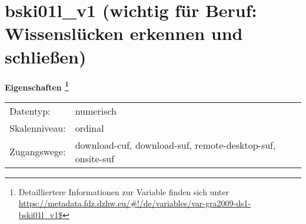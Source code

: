 
    \setcounter{footnote}{0}

    \vspace*{-1.8cm}
	\section{bski01l\_v1 (wichtig für Beruf: Wissenslücken erkennen und schließen)}
	\label{section:bski01l_v1}



    \vspace*{0.5cm}
    \noindent\textbf{Eigenschaften
	\footnote{Detailliertere Informationen zur Variable finden sich unter
		\url{https://metadata.fdz.dzhw.eu/\#!/de/variables/var-gra2009-ds1-bski01l_v1$}}}\\
	\begin{tabularx}{\hsize}{@{}lX}
	Datentyp: & numerisch \\
	Skalenniveau: & ordinal \\
	Zugangswege: &
	  download-cuf, 
	  download-suf, 
	  remote-desktop-suf, 
	  onsite-suf
 \\
    \end{tabularx}



